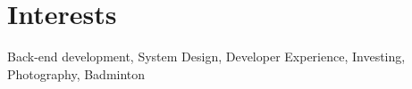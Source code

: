 \section*{Interests}
\noindent\makebox[\linewidth]{\rule{\textwidth}{0.2pt}}
Back-end development, System Design, Developer Experience, Investing, Photography, Badminton